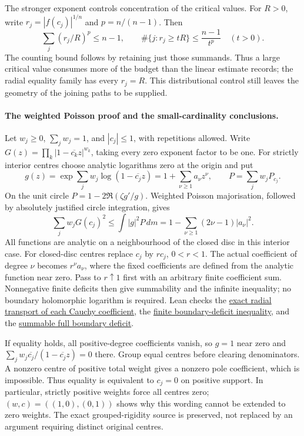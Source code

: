 \documentclass[11pt]{article}
\begin{document}
The stronger exponent controls concentration of the critical values.
For $R>0$, write $r_j=|f(c_j)|^{1/n}$ and $p=n/(n-1)$. Then
\[
 \sum_j(r_j/R)^p\le n-1,\qquad
 \#\{j:r_j\ge tR\}\le\frac{n-1}{t^p}\quad(t>0).
\]
The counting bound follows by retaining just those summands. Thus a large
critical value consumes more of the budget than the linear estimate records;
the radial equality family has every $r_j=R$. This distributional control
still leaves the geometry of the joining paths to be supplied.

\paragraph{The weighted Poisson proof and the small-cardinality conclusions.}
Let $w_j\ge0$, $\sum_jw_j=1$, and $|c_j|\le1$, with repetitions allowed.
Write $G(z)=\prod_k|1-\overline{c_k}z|^{w_k}$, taking every zero exponent
factor to be one. For strictly interior centres choose analytic logarithms
zero at the origin and put
\[
 g(z)=\exp\sum_jw_j\log(1-\overline{c_j}z)
     =1+\sum_{\nu\ge1}a_\nu z^\nu,\qquad
 P=\sum_jw_jP_{c_j}.
\]
On the unit circle $P=1-2\Re(\zeta g'/g)$. Weighted Poisson majorisation,
followed by absolutely justified circle integration, gives
\[
 \sum_jw_jG(c_j)^2\le\int |g|^2P\,dm
 =1-\sum_{\nu\ge1}(2\nu-1)|a_\nu|^2.
\]
All functions are analytic on a neighbourhood of the closed disc in this
interior case. For closed-disc centres replace $c_j$ by $rc_j$, $0<r<1$.
The actual coefficient of degree $\nu$ becomes $r^\nu a_\nu$, where the
fixed coefficients are defined from the analytic function near zero.
Pass to $r\uparrow1$ first with an arbitrary finite coefficient sum.
Nonnegative finite deficits then give summability and the infinite inequality;
no boundary holomorphic logarithm is required. Lean checks the
\href{https://github.com/wcook04/plectis-erdos/blob/3f1a5e9b284b9c3348eebd549e24c2f3972606ae/ErdosProblems/Erdos1041/WeightedCauchyTransportR10.lean\#L66}{exact radial transport of each Cauchy coefficient},
the
\href{https://github.com/wcook04/plectis-erdos/blob/3f1a5e9b284b9c3348eebd549e24c2f3972606ae/ErdosProblems/Erdos1041/WeightedBoundaryDeficitR10.lean\#L108}{finite boundary-deficit inequality},
and the
\href{https://github.com/wcook04/plectis-erdos/blob/3f1a5e9b284b9c3348eebd549e24c2f3972606ae/ErdosProblems/Erdos1041/WeightedBoundaryDeficitR10.lean\#L153}{summable full boundary deficit}.

If equality holds, all positive-degree coefficients vanish, so $g=1$ near
zero and $\sum_jw_j\overline{c_j}/(1-\overline{c_j}z)=0$ there.
Group equal centres before clearing denominators. A nonzero centre of positive
total weight gives a nonzero pole coefficient, which is impossible. Thus
equality is equivalent to $c_j=0$ on positive support. In particular,
strictly positive weights force all centres zero; $(w,c)=((1,0),(0,1))$
shows why this wording cannot be extended to zero weights.
The exact grouped-rigidity source is preserved, not replaced by an argument
requiring distinct original centres.
\end{document}
